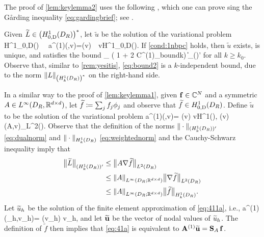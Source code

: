 The proof of \cref{lem:keylemma2} uses the following , which one can prove sing the G\aa rding inequality \cref{eq:gardingbrief}; see \cite[Lemma 5.1]{GrPeSp:19}.

\label{lem:H1}
Given $\widetilde{\LE}\in \HozDDRs$, let $\widetilde{u}$ be the solution of the variational problem
\beqs
{} \,\, \in H^1_{0,D}(\DR) \,\,\tst \,\,
a^{(1)}(,v)=\widetilde{\LE}(v) \,\, \tfa v\in H^1_{0,D}(\DR).
\eeqs
If \cref{cond:1nbpc} holds, then $\widetilde{u}$ exists, is unique, and satisfies the bound
\beq\label{eq:bound2}
_{\HokDR} \leq {}\left( 1 + 2 C^{(1)}_{\rm bound}\nsomax  k\right) \big\|\widetilde{\LE}\big\|_{(\HokDR)'}
\eeq
for all $k\geq k_0$.
\ele
Observe that, similar to \cref{rem:yesitis}, \cref{eq:bound2} is a $k$-independent bound, due to the norm $\NHokDRs{\LE}$ on the right-hand side.


In a similar way to the proof of \cref{lem:keylemma1}, given $\mathbf{f} \in \mathbb C^N$ and a symmetric $A\in L^\infty(D_{R}, \mathbb R^{d\times d})$, let $\widetilde{f} \coloneqq \sum_j f_j \phi_j$ and observe that $\widetilde{f} \in \HozDDR$. Define $\widetilde{u}$ to be the solution of the variational problem 
\beq\label{eq:411a}
a^{(1)}(,v)= \widetilde{\LE}(v) \quad{} v\in H^1(\Omega),
\quad{} \quad
 \widetilde{\LE}(v) \de(A\nabla{},\nabla v)_{L^2(\Omega)}.
\eeq
Observe that the definition of the norms $\|\cdot\|_{(\HokDR)'}$ \cref{eq:dualnorm} and $\|\cdot\|_{\HokDR}$ \cref{eq:weightednorm} and the Cauchy-Schwarz inequality imply that
\begin{align}
\big\| \widetilde{\LE}\big\|_{(\HokDR)'}&\leq \big\|A\nabla \widetilde{f}\big\|_{\LtDR}\nonumber\\
&\leq \NLiDRRRdtd{A} \big\|\nabla \widetilde{f}\big\|_{\LtDR}\label{eq:Fbounda}\\
&\leq \NLiDRRRdtd{A} \big\| \widetilde{f}\big\|_{\HokDR}.\label{eq:Fbound}
\end{align}
Let $\widetilde{u}_h$ be the solution of the finite element approximation of \cref{eq:411a}, i.e.,
\beq\label{eq:41a}
a^{(1)}(\tu_h,v_h)= \widetilde{\LE}(v_h) \quad{} v_h\in \Vhp,
\eeq
and let $\widetilde{\mathbf{u}}$ be the vector of nodal values of $\widetilde{u}_h$. The definition of $\widetilde{f}$ then implies that \cref{eq:41a} is equivalent to $\mathbf{A}^{(1)} \widetilde{\mathbf{u}} = \mathbf{S}_A\,\mathbf{f}$. 

